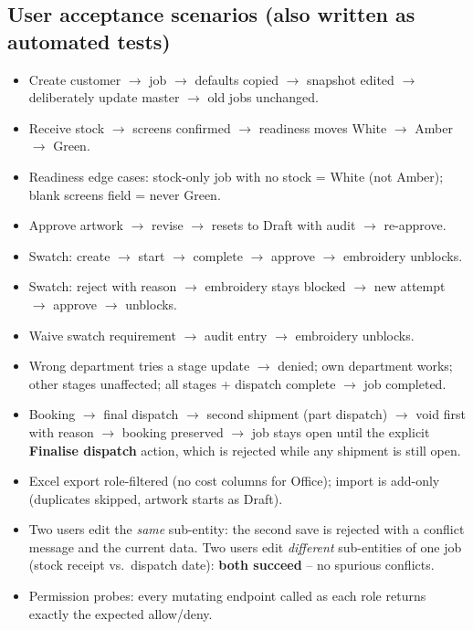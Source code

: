 \subsection*{User acceptance scenarios (also written as automated tests)}

\begin{itemize}
  \item Create customer $\rightarrow$ job $\rightarrow$ defaults copied $\rightarrow$
        snapshot edited $\rightarrow$ deliberately update master $\rightarrow$ old jobs
        unchanged.
  \item Receive stock $\rightarrow$ screens confirmed $\rightarrow$ readiness moves
        White $\rightarrow$ Amber $\rightarrow$ Green.
  \item Readiness edge cases: stock-only job with no stock = White (not Amber);
        blank screens field = never Green.
  \item Approve artwork $\rightarrow$ revise $\rightarrow$ resets to Draft with audit
        $\rightarrow$ re-approve.
  \item Swatch: create $\rightarrow$ start $\rightarrow$ complete $\rightarrow$ approve
        $\rightarrow$ embroidery unblocks.
  \item Swatch: reject with reason $\rightarrow$ embroidery stays blocked $\rightarrow$
        new attempt $\rightarrow$ approve $\rightarrow$ unblocks.
  \item Waive swatch requirement $\rightarrow$ audit entry $\rightarrow$ embroidery
        unblocks.
  \item Wrong department tries a stage update $\rightarrow$ denied; own department works;
        other stages unaffected; all stages + dispatch complete $\rightarrow$ job
        completed.
  \item Booking $\rightarrow$ final dispatch $\rightarrow$ second shipment (part
        dispatch) $\rightarrow$ void first with reason $\rightarrow$ booking preserved
        $\rightarrow$ job stays open until the explicit \textbf{Finalise dispatch}
        action, which is rejected while any shipment is still open.
  \item Excel export role-filtered (no cost columns for Office); import is add-only
        (duplicates skipped, artwork starts as Draft).
  \item Two users edit the \emph{same} sub-entity: the second save is rejected with a
        conflict message and the current data. Two users edit \emph{different}
        sub-entities of one job (stock receipt vs.\ dispatch date): \textbf{both
        succeed} -- no spurious conflicts.
  \item Permission probes: every mutating endpoint called as each role returns exactly
        the expected allow/deny.
\end{itemize}

